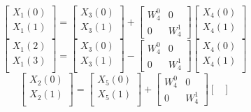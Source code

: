 \documentclass[journal,12pt,twocolumn]{IEEEtran}
\renewcommand\thesection{\arabic{section}}
\begin{document}
\begin{enumerate}[label=\thesection.\arabic*]
\begin{equation}
\begin{bmatrix}
X_{1}(0) \\ 
X_{1}(1)\\ 
\end{bmatrix}
=
\begin{bmatrix}
X_{3}(0) \\ 
X_{3}(1)\\ 
\end{bmatrix}
+
\begin{bmatrix}
W^{0}_{4} & 0\\
0 & W^{1}_{4}
\end{bmatrix}
\begin{bmatrix}
X_{4}(0) \\ 
X_{4}(1) \\ 
\end{bmatrix}
\label{eq:4-1-high}
\end{equation}
\begin{equation}
\begin{bmatrix}
X_{1}(2) \\ 
X_{1}(3)\\ 
\end{bmatrix}
=
\begin{bmatrix}
X_{3}(0) \\ 
X_{3}(1)\\ 
\end{bmatrix}
-
\begin{bmatrix}
W^{0}_{4} & 0\\
0 & W^{1}_{4}
\end{bmatrix}
\begin{bmatrix}
X_{4}(0) \\ 
X_{4}(1) \\ 
\end{bmatrix}
\label{eq:4-1-low}
\end{equation}
\begin{equation}
\begin{bmatrix}
X_{2}(0) \\ 
X_{2}(1)\\ 
\end{bmatrix}
=
\begin{bmatrix}
X_{5}(0) \\ 
X_{5}(1)\\ 
\end{bmatrix}
+
\begin{bmatrix}
W^{0}_{4} & 0\\
0 & W^{1}_{4}
\end{bmatrix}
\begin{bmatrix}

\end{bmatrix}
\end{equation}
\end{enumerate}
\end{document}
